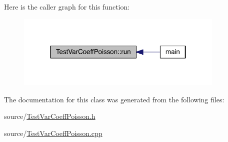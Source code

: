Here is the caller graph for this function\+:\nopagebreak
\begin{figure}[H]
\begin{center}
\leavevmode
\includegraphics[width=282pt]{d7/d0a/class_test_var_coeff_poisson_add52c16d25492f911193e23bb6ee6b2e_icgraph}
\end{center}
\end{figure}




The documentation for this class was generated from the following files\+:\begin{DoxyCompactItemize}
\item 
source/\hyperlink{_test_var_coeff_poisson_8h}{Test\+Var\+Coeff\+Poisson.\+h}\item 
source/\hyperlink{_test_var_coeff_poisson_8cpp}{Test\+Var\+Coeff\+Poisson.\+cpp}\end{DoxyCompactItemize}
